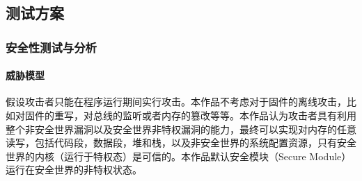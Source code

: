 \documentclass[UTF8,12pt,a4paper,twoside]{ctexart}
\numberwithin{figure}{section}
\begin{document}
\subsection{测试方案}
\subsubsection{安全性测试与分析}
\paragraph{威胁模型}
\par 假设攻击者只能在程序运行期间实行攻击。本作品不考虑对于固件的离线攻击，比如对固件的重写，对总线的监听或者内存的篡改等等。本作品认为攻击者具有利用整个非安全世界漏洞以及安全世界非特权漏洞的能力，最终可以实现对内存的任意读写，包括代码段，数据段，堆和栈，以及非安全世界的系统配置资源，只有安全世界的内核（运行于特权态）是可信的。本作品默认安全模块（Secure Module）运行在安全世界的非特权状态。
\end{document}

